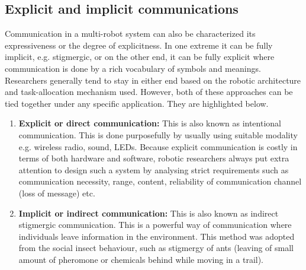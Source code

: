 \documentclass{intech}
\begin{document}
\subsection*{Explicit and implicit communications}
Communication in a multi-robot system can also be characterized its expressiveness or the degree of explicitness. In one extreme it can be fully implicit, e.g. stigmergic, or on the other end, it can be fully explicit where communication is done by a rich vocabulary of symbols and meanings. Researchers generally tend to stay in either end based on the robotic architecture and task-allocation mechanism used. However, both of these approaches can be tied together under any specific application. They are highlighted below.
\begin{enumerate}
\item \textbf{Explicit or direct communication: }
This is also known as intentional communication. This is done purposefully by usually using suitable modality e.g. wireless radio, sound, LEDs. Because explicit communication is costly in terms of both hardware and software, robotic researchers always put extra attention to design such a system by analysing strict requirements such as communication necessity, range, content, reliability of communication channel (loss of message) etc.
%
\item \textbf{Implicit or indirect communication:} 
This is also known as indirect stigmergic communication. This is a powerful way of communication where individuals leave information in the environment. This method was adopted from the social insect behaviour, such as stigmergy of ants (leaving of small amount of pheromone or chemicals behind while moving in a trail).
\end{enumerate}
\end{document}
